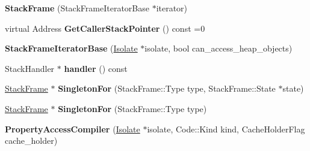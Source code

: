\begin{DoxyCompactItemize}
\item 
{\bfseries Stack\+Frame} (Stack\+Frame\+Iterator\+Base $\ast$iterator)\hypertarget{classv8_1_1internal_1_1_b_a_s_e___e_m_b_e_d_d_e_d_a54fcea9191c303d0bcc7df0722fbc417}{}\label{classv8_1_1internal_1_1_b_a_s_e___e_m_b_e_d_d_e_d_a54fcea9191c303d0bcc7df0722fbc417}

\item 
virtual Address {\bfseries Get\+Caller\+Stack\+Pointer} () const  =0\hypertarget{classv8_1_1internal_1_1_b_a_s_e___e_m_b_e_d_d_e_d_a2f960f71101538cc0226192ca2e9ea4e}{}\label{classv8_1_1internal_1_1_b_a_s_e___e_m_b_e_d_d_e_d_a2f960f71101538cc0226192ca2e9ea4e}

\item 
{\bfseries Stack\+Frame\+Iterator\+Base} (\hyperlink{classv8_1_1internal_1_1_isolate}{Isolate} $\ast$isolate, bool can\+\_\+access\+\_\+heap\+\_\+objects)\hypertarget{classv8_1_1internal_1_1_b_a_s_e___e_m_b_e_d_d_e_d_a568b9205d5e8311b411fe334a88595b3}{}\label{classv8_1_1internal_1_1_b_a_s_e___e_m_b_e_d_d_e_d_a568b9205d5e8311b411fe334a88595b3}

\item 
Stack\+Handler $\ast$ {\bfseries handler} () const \hypertarget{classv8_1_1internal_1_1_b_a_s_e___e_m_b_e_d_d_e_d_a17b24738b33e4e7b769cf45b217f4873}{}\label{classv8_1_1internal_1_1_b_a_s_e___e_m_b_e_d_d_e_d_a17b24738b33e4e7b769cf45b217f4873}

\item 
\hyperlink{classv8_1_1_stack_frame}{Stack\+Frame} $\ast$ {\bfseries Singleton\+For} (Stack\+Frame\+::\+Type type, Stack\+Frame\+::\+State $\ast$state)\hypertarget{classv8_1_1internal_1_1_b_a_s_e___e_m_b_e_d_d_e_d_a84154fbd46eee20509f11c950952034e}{}\label{classv8_1_1internal_1_1_b_a_s_e___e_m_b_e_d_d_e_d_a84154fbd46eee20509f11c950952034e}

\item 
\hyperlink{classv8_1_1_stack_frame}{Stack\+Frame} $\ast$ {\bfseries Singleton\+For} (Stack\+Frame\+::\+Type type)\hypertarget{classv8_1_1internal_1_1_b_a_s_e___e_m_b_e_d_d_e_d_a26331ecd69c7f3c0f328868a7ff33d4d}{}\label{classv8_1_1internal_1_1_b_a_s_e___e_m_b_e_d_d_e_d_a26331ecd69c7f3c0f328868a7ff33d4d}

\item 
{\bfseries Property\+Access\+Compiler} (\hyperlink{classv8_1_1internal_1_1_isolate}{Isolate} $\ast$isolate, Code\+::\+Kind kind, Cache\+Holder\+Flag cache\+\_\+holder)\hypertarget{classv8_1_1internal_1_1_b_a_s_e___e_m_b_e_d_d_e_d_af819df682b31dcdc64f039521c686f58}{}\label{classv8_1_1internal_1_1_b_a_s_e___e_m_b_e_d_d_e_d_af819df682b31dcdc64f039521c686f58}


\end{DoxyCompactItemize}
